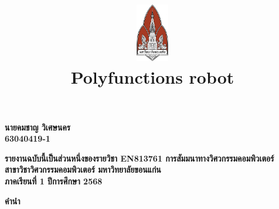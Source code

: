 \documentclass[a4paper]{article}
\date{}
\author{}
\title{
    \includegraphics[width=1in, height=1in, keepaspectratio]{logo.png}
    \\[2ex]
    {\fontsize{32pt}{36pt}\selectfont\textbf{Polyfunctions robot}}
}
\newcommand{\thailetters}{กขคงจฉชซฌญฎฏฐฑฒณดตถทธนบปผฝพฟภมยรลวศษสหฬอฮ}
\newcommand{\thaipage}[1]{\StrChar{\thailetters}{#1}}
\begin{document}
    \maketitle
    \thispagestyle{empty}

    \vfill
    \begin{center}
        {\fontsize{22pt}{26pt}\selectfont\textbf{
            นายคมชาญ วิเศษนคร 
            \\ 63040419-1
        }}
    \end{center}
    \vfill

    \vfill
    \begin{center}
        {\fontsize{16pt}{20pt}\selectfont\textbf{
            รายงานฉบับนี้เป็นส่วนหนึ่งของรายวิชา EN813761 การสัมมนาทางวิศวกรรมคอมพิวเตอร์
            \\ สาขาวิชาวิศวกรรมคอมพิวเตอร์ มหาวิทยาลัยขอนแก่น
            \\ ภาคเรียนที่ 1 ปีการศึกษา 2568 
        }}
    \end{center}

    \newpage
    \setcounter{page}{1}
    \renewcommand{\thepage}{\thaipage{\value{page}}}
    \pagestyle{plain}
    \noindent
    {\centering
        {\fontsize{18pt}{22pt}\selectfont\textbf{คำนำ}\par}
    }
    
\end{document}
